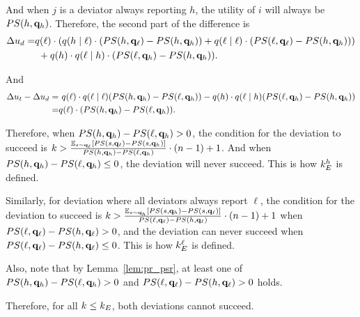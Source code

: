 And when $j$ is a deviator always reporting $h$, the utility of $i$ will always be $PS(h, \mathbf{q}_h)$. Therefore, the second part of the difference is
\begin{align*}
    \Delta u_d = &q(\ell) \cdot(q(h \mid \ell) \cdot (PS(h, \mathbf{q}_\ell) -PS(h, \mathbf{q}_h)) + q(\ell \mid \ell) \cdot (PS(\ell, \mathbf{q}_\ell) - PS(h, \mathbf{q}_h)))\\ 
    &\ + q(h)\cdot q(\ell \mid h) \cdot (PS(\ell, \mathbf{q}_h) - PS(h, \mathbf{q}_h)).
\end{align*}

And 
\begin{align*}
    \Delta u_t - \Delta u_d = &\ q(\ell) \cdot q(\ell \mid \ell) (PS(h, \mathbf{q}_h) - PS(\ell, \mathbf{q}_h)) - q(h)\cdot q(\ell \mid h) (PS(\ell, \mathbf{q}_h) - PS(h, \mathbf{q}_h))\\
    =& q(\ell)\cdot   (PS(h, \mathbf{q}_h) - PS(\ell, \mathbf{q}_h)). 
\end{align*}

Therefore, when $PS(h, \mathbf{q}_h) - PS(\ell, \mathbf{q}_h) > 0$, the condition for the deviation to succeed is $k > \frac{\mathbb{E}_{s\sim \mathbf{q}_{\ell}}[PS(s, \mathbf{q}_{\ell}) - PS(s, \mathbf{q}_{h})]}{PS(h, \mathbf{q}_h) - PS(\ell, \mathbf{q}_h)} \cdot (n-1) + 1$. And when $PS(h, \mathbf{q}_h) - PS(\ell, \mathbf{q}_h) \le 0$, the deviation will never succeed. This is how $k_E^h$ is defined. 

Similarly, for deviation where all deviators always report $\ell$, the condition for the deviation to succeed is $k >\frac{\mathbb{E}_{s\sim \mathbf{q}_{h}}[PS(s, \mathbf{q}_{h}) - PS(s, \mathbf{q}_{\ell})]}{PS(\ell, \mathbf{q}_\ell) - PS(h, \mathbf{q}_\ell)} \cdot (n-1) + 1$ when $PS(\ell, \mathbf{q}_\ell) - PS(h, \mathbf{q}_\ell) > 0$, and the deviation can never succeed when $PS(\ell, \mathbf{q}_\ell) - PS(h, \mathbf{q}_\ell) \le 0$. This is how $k_E^{\ell}$ is defined. 

Also, note that by Lemma~\ref{lem:pr_psr}, at least one of $PS(h, \mathbf{q}_h) - PS(\ell, \mathbf{q}_h) > 0$ and $PS(\ell, \mathbf{q}_\ell) - PS(h, \mathbf{q}_\ell) > 0$ holds. 

Therefore, for all $k\le k_E$, both deviations cannot succeed. 


